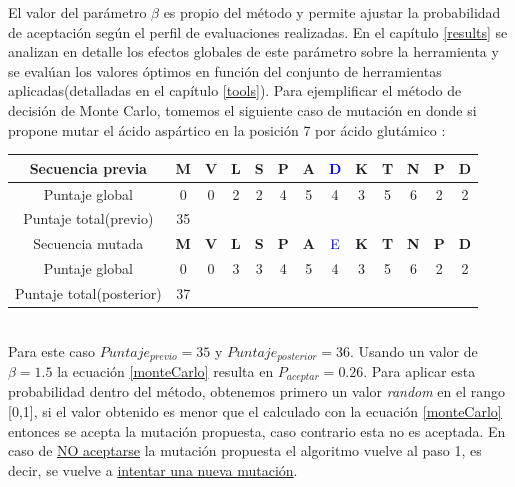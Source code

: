 \begin{enumerate}
    
    El valor del parámetro $\beta$ es propio del método y permite ajustar la probabilidad de aceptación según el perfil de evaluaciones realizadas. 
    En el capítulo \ref{results} se analizan en detalle los efectos globales de este parámetro sobre la herramienta y se evalúan los valores óptimos en función del conjunto de herramientas aplicadas(detalladas en el capítulo \ref{tools}).
    Para ejemplificar el método de decisión de Monte Carlo, tomemos el siguiente caso de mutación en donde si propone mutar el ácido aspártico en la posición 7 por ácido glutámico :
    
      \vspace{0.3cm}
       \begin{tabular}{ccccccccccccc}\hline
	Secuencia previa &  \textbf{M} & \textbf{V} & \textbf{L} & \textbf{S} & \textbf{P} & \textbf{A} & \textcolor{blue}{D} & \textbf{K} & \textbf{T} & \textbf{N} & \textbf{P} & \textbf{D} \\ \hline
	Puntaje global & 0 & 0 & 2 & 2 & 4 & 5 & 4 & 3 & 5 & 6 & 2 & 2\\  \hline
       Puntaje total(previo) & 35 \\ \hline \hline 
       Secuencia mutada  &  \textbf{M} & \textbf{V} & \textbf{L} & \textbf{S} & \textbf{P} & \textbf{A} & \textcolor{blue}{E}& \textbf{K} & \textbf{T} & \textbf{N} & \textbf{P} & \textbf{D}\\  \hline
	Puntaje global & 0 & 0 & 3 & 3 & 4 & 5 & 4 & 3 & 5 & 6 & 2 & 2\\  \hline
       Puntaje total(posterior) & 37 \\ \hline
      \end{tabular}\\
    
    Para este caso $Puntaje_{previo}=35$ y $Puntaje_{posterior}=36$. Usando un valor de $\beta=1.5$ la ecuación \ref{monteCarlo} resulta en $P_{aceptar} = 0.26$.
    Para aplicar esta probabilidad dentro del método, obtenemos primero un valor \textit{random} en el rango [0,1], si el valor obtenido es menor que el calculado con la ecuación \ref{monteCarlo} entonces se acepta la mutación propuesta, 
    caso contrario esta no es aceptada. 
    En caso de \underline{NO aceptarse} la mutación propuesta el algoritmo vuelve al paso 1, es decir, se vuelve a \underline{intentar una nueva mutación}. 
        
\end{enumerate} 



